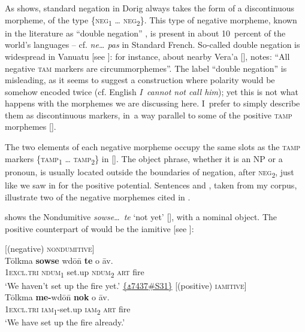 \documentclass[output=paper,colorlinks,citecolor=brown,draft]{langscibook}
\begin{document}
As  shows, standard negation in Dorig always takes the form of a discontinuous morpheme, of the type \{\textsc{neg}\textsc{\textsubscript{1} }… \textsc{neg\textsubscript{2}}\}. This type of negative morpheme, known in the literature as “double negation” \citep[88]{Dahl1979}, is present in about 10~percent of the world’s languages \citep{Dryer2013-wals112} – cf. \textit{ne… pas} in Standard French. So-called double negation is widespread in Vanuatu [see ]: for instance, about nearby Vera’a [], \citet[31]{Schnell2011} notes: “All negative \textsc{tam} markers are circummorphemes”. The label “double negation” is misleading, as it seems to suggest a construction where polarity would be somehow encoded twice (cf. English \textit{I~cannot not call him}); yet this is not what happens with the morphemes we are discussing here. I~prefer to simply describe them as discontinuous markers, in~a way parallel to some of the positive \textsc{tamp} morphemes [].

The two elements of each negative morpheme occupy the same slots as the \textsc{tamp} markers \{\textsc{tamp}\textsc{\textsubscript{1} }… \textsc{tamp}\textsubscript{2}\} in  []. The object phrase, whether it is an NP or a pronoun, is usually located outside the boundaries of negation, after \textsc{neg\textsubscript{2}}, just like we saw in  for the positive potential. Sentences  and , taken from my corpus, illustrate two of the negative morphemes cited in . 

 shows the Nondumitive \textit{sowse}\ldots\ \textit{te} ‘not yet’ [], with a nominal object. The positive counterpart of  would be the iamitive  [see ]:

\ea\label{ex:dor:fire}
    \ea\label{ex:dor:fire1} {\small [({negative}) \textsc{nondumitive}]} \\
        \gll  Tōlkma \textbf{sowse} wdō\={n} \textbf{te} o āv.\\ 
              \textsc{1excl.tri} \textsc{ndum\textsubscript{1}} set.up \textsc{ndum\textsubscript{2}} \textsc{art} fire\\
        \glt ‘We haven’t set up the fire yet.’ \quad \href{https://doi.org/10.24397/pangloss-0007437#S31}{\{\texttt{⚓}7437\#S31\}}
    \ex\label{ex:dor:fire2} {\small [(positive) \textsc{iamitive}]} \\
        \gll  Tōlkma \textbf{me-}wdō\={n} \textbf{nok} o āv.\\
              \textsc{1excl.tri} \textsc{iam\textsubscript{1}}\textsc{-}set.up \textsc{iam\textsubscript{2}} \textsc{art} fire\\
        \glt ‘We have set up the fire already.’
    \z 
\z 
\end{document}
